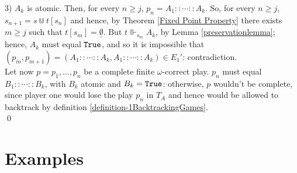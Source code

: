 \documentclass[copyright,creativecommons]{eptcs}
\newcommand{\NatSet}                   {\mathbb{N}}
\newcommand{\True}                     { {\tt{True}} }
\newcommand{\comment}[1]{}
\newcommand{\makestate}      [1]       { {\underline{#1}} }
\begin{document}
{ 3) $A_k$ is atomic. Then, for every $n\geq j$, $p_n=A_1::\cdots::
A_k$. So, for every $n\geq j$, $s_{n+1}=s\Cup t[s_n]$ and  hence, by Theorem \ref{Fixed Point Property} there
exists $m\geq j$ such that  $t[s_{m}]=\makestate{\emptyset}$. But $t
\Vvdash_{s_{m}} A_k$, by Lemma \ref{preservationlemma}; hence, $A_k$ must equal $\True$, and so it is
impossible that $(p_m, p_{m+1})=(A_1::\cdots ::A_k, A_1::\cdots
::A_k)\in E_1'$: contradiction.\\
Let now $p=p_1,\ldots, p_n$ be a
complete finite $\omega$-correct play. $p_n$ must equal 
$B_1::\cdots::B_k$, with $B_k$ atomic and $B_k=\True$: otherwise,
$p$ wouldn't be complete, since player one would lose the play $p_n$ in $T_A$ and hence would be allowed to backtrack by definition \ref{definition-1BacktrackingGames}.\\
\qed }




 
\section{Examples}
\label{examples}
\comment{
\textbf{Example ($\Sigma^0_1$ and $\Pi^0_2$ formulas).} Suppose
$u\Vdash \exists x P(x)$, with $P(x)$ atomic. Let $n$ be the
smallest natural number such that $s:=(\pi_1u)^n[\varnothing]$ is a
fixed point of $\pi_1u$. We have $u\Vdash_s \exists x P(x)$ and so
$\pi_1u\Vdash_s P(\overline{m})$, where $\overline{m}=(\pi_0u)[s]$.
Since $(\pi_1u)[s]=s$, $P(\overline{m})$ must be true. Hence, here
is the algorithm (in pseudo code) to find the witness for $\exists
x
P(x)$:\\ \\$s:=\varnothing$;\\ repeat $s:=(\pi_1u)[s]$ until
$(\pi_1u)[s]=s$;\\
return $(\pi_0u)[s];$\\ Suppose now $t\Vdash \forall x\exists y
P(x,y)$. Then, given $n\in\NatSet$, $t\overline{n}\Vdash\exists
yP(\overline{n},y)$. So we can apply the algorithm for $\Sigma^0_1$
formulas. Hence, the extracted algorithm is the following:\\
$u:=t\overline{n}$;\\ $s:=\varnothing$;\\ repeat $s:=(\pi_1u)[s]$
until
$(\pi_1u)[s]=s$;\\ return $(\pi_0u)[s];$\\
}
\end{document}
